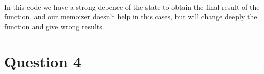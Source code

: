 \documentclass[letterpaper,10pt]{article}
\begin{document}
\paragraph{} In this code we have a strong depence of the state to obtain the final result of the function, and our memoizer doesn't help in this cases, but will change deeply the function and give wrong results.
\section*{Question 4}
\end{document}
